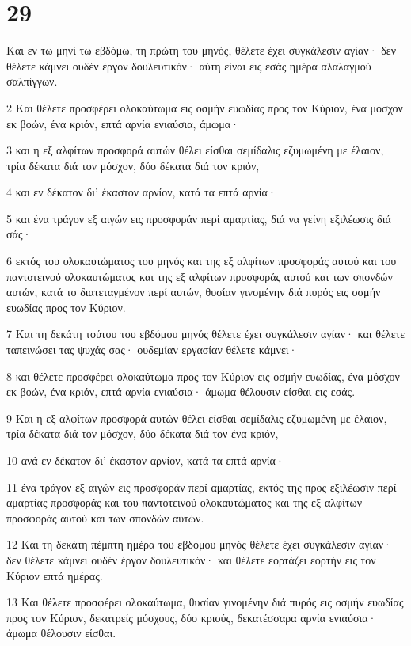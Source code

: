 \chapter{29}

\par Και εν τω μηνί τω εβδόμω, τη πρώτη του μηνός, θέλετε έχει συγκάλεσιν αγίαν· δεν θέλετε κάμνει ουδέν έργον δουλευτικόν· αύτη είναι εις εσάς ημέρα αλαλαγμού σαλπίγγων.
\par 2 Και θέλετε προσφέρει ολοκαύτωμα εις οσμήν ευωδίας προς τον Κύριον, ένα μόσχον εκ βοών, ένα κριόν, επτά αρνία ενιαύσια, άμωμα·
\par 3 και η εξ αλφίτων προσφορά αυτών θέλει είσθαι σεμίδαλις εζυμωμένη με έλαιον, τρία δέκατα διά τον μόσχον, δύο δέκατα διά τον κριόν,
\par 4 και εν δέκατον δι' έκαστον αρνίον, κατά τα επτά αρνία·
\par 5 και ένα τράγον εξ αιγών εις προσφοράν περί αμαρτίας, διά να γείνη εξιλέωσις διά σάς·
\par 6 εκτός του ολοκαυτώματος του μηνός και της εξ αλφίτων προσφοράς αυτού και του παντοτεινού ολοκαυτώματος και της εξ αλφίτων προσφοράς αυτού και των σπονδών αυτών, κατά το διατεταγμένον περί αυτών, θυσίαν γινομένην διά πυρός εις οσμήν ευωδίας προς τον Κύριον.
\par 7 Και τη δεκάτη τούτου του εβδόμου μηνός θέλετε έχει συγκάλεσιν αγίαν· και θέλετε ταπεινώσει τας ψυχάς σας· ουδεμίαν εργασίαν θέλετε κάμνει·
\par 8 και θέλετε προσφέρει ολοκαύτωμα προς τον Κύριον εις οσμήν ευωδίας, ένα μόσχον εκ βοών, ένα κριόν, επτά αρνία ενιαύσια· άμωμα θέλουσιν είσθαι εις εσάς.
\par 9 Και η εξ αλφίτων προσφορά αυτών θέλει είσθαι σεμίδαλις εζυμωμένη με έλαιον, τρία δέκατα διά τον μόσχον, δύο δέκατα διά τον ένα κριόν,
\par 10 ανά εν δέκατον δι' έκαστον αρνίον, κατά τα επτά αρνία·
\par 11 ένα τράγον εξ αιγών εις προσφοράν περί αμαρτίας, εκτός της προς εξιλέωσιν περί αμαρτίας προσφοράς και του παντοτεινού ολοκαυτώματος και της εξ αλφίτων προσφοράς αυτού και των σπονδών αυτών.
\par 12 Και τη δεκάτη πέμπτη ημέρα του εβδόμου μηνός θέλετε έχει συγκάλεσιν αγίαν· δεν θέλετε κάμνει ουδέν έργον δουλευτικόν· και θέλετε εορτάζει εορτήν εις τον Κύριον επτά ημέρας.
\par 13 Και θέλετε προσφέρει ολοκαύτωμα, θυσίαν γινομένην διά πυρός εις οσμήν ευωδίας προς τον Κύριον, δεκατρείς μόσχους, δύο κριούς, δεκατέσσαρα αρνία ενιαύσια· άμωμα θέλουσιν είσθαι.
